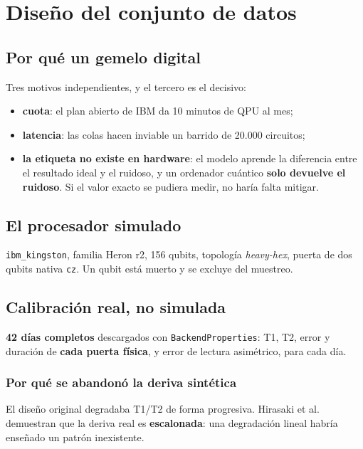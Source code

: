 \chapter{Diseño del conjunto de datos}
\label{cap:dataset}


\section{Por qué un gemelo digital}
\label{sec:gemelo}
Tres motivos independientes, y el tercero es el decisivo:
\begin{itemize}
    \item \textbf{cuota}: el plan abierto de IBM da 10 minutos de QPU al mes;
    \item \textbf{latencia}: las colas hacen inviable un barrido de 20.000 circuitos;
    \item \textbf{la etiqueta no existe en hardware}: el modelo aprende la diferencia entre el
          resultado ideal y el ruidoso, y un ordenador cuántico \textbf{solo devuelve el
          ruidoso}. Si el valor exacto se pudiera medir, no haría falta mitigar.
\end{itemize}

\section{El procesador simulado}
\label{sec:chip}
\texttt{ibm\_kingston}, familia Heron r2, 156 qubits, topología \textit{heavy-hex}, puerta de
dos qubits nativa \texttt{cz}. Un qubit está muerto y se excluye del muestreo.

\section{Calibración real, no simulada}
\label{sec:calibracion}
\textbf{42 días completos} descargados con \texttt{BackendProperties}: T1, T2, error y duración
de \textbf{cada puerta física}, y error de lectura asimétrico, para cada día.

\subsection{Por qué se abandonó la deriva sintética}
El diseño original degradaba T1/T2 de forma progresiva. Hirasaki et al. demuestran que la
deriva real es \textbf{escalonada}: una degradación lineal habría enseñado un patrón inexistente.

